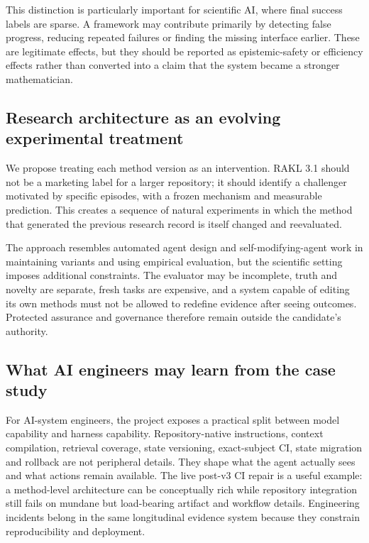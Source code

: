 This distinction is particularly important for scientific AI, where final success labels are sparse. A framework may contribute primarily by detecting false progress, reducing repeated failures or finding the missing interface earlier. These are legitimate effects, but they should be reported as epistemic-safety or efficiency effects rather than converted into a claim that the system became a stronger mathematician.

\subsection{Research architecture as an evolving experimental treatment}

We propose treating each method version as an intervention. RAKL 3.1 should not be a marketing label for a larger repository; it should identify a challenger motivated by specific episodes, with a frozen mechanism and measurable prediction. This creates a sequence of natural experiments in which the method that generated the previous research record is itself changed and reevaluated.

The approach resembles automated agent design and self-modifying-agent work in maintaining variants and using empirical evaluation, but the scientific setting imposes additional constraints. The evaluator may be incomplete, truth and novelty are separate, fresh tasks are expensive, and a system capable of editing its own methods must not be allowed to redefine evidence after seeing outcomes. Protected assurance and governance therefore remain outside the candidate's authority.

\subsection{What AI engineers may learn from the case study}

For AI-system engineers, the project exposes a practical split between model capability and harness capability. Repository-native instructions, context compilation, retrieval coverage, state versioning, exact-subject CI, state migration and rollback are not peripheral details. They shape what the agent actually sees and what actions remain available. The live post-v3 CI repair is a useful example: a method-level architecture can be conceptually rich while repository integration still fails on mundane but load-bearing artifact and workflow details. Engineering incidents belong in the same longitudinal evidence system because they constrain reproducibility and deployment.

